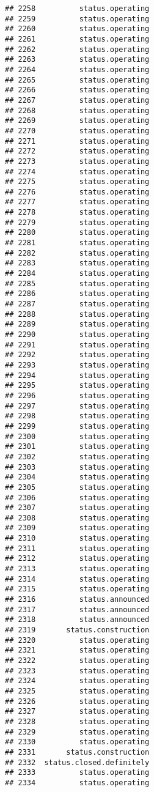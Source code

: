 \documentclass[
]{article}
\begin{document}
\begin{verbatim}
## 2258          status.operating
## 2259          status.operating
## 2260          status.operating
## 2261          status.operating
## 2262          status.operating
## 2263          status.operating
## 2264          status.operating
## 2265          status.operating
## 2266          status.operating
## 2267          status.operating
## 2268          status.operating
## 2269          status.operating
## 2270          status.operating
## 2271          status.operating
## 2272          status.operating
## 2273          status.operating
## 2274          status.operating
## 2275          status.operating
## 2276          status.operating
## 2277          status.operating
## 2278          status.operating
## 2279          status.operating
## 2280          status.operating
## 2281          status.operating
## 2282          status.operating
## 2283          status.operating
## 2284          status.operating
## 2285          status.operating
## 2286          status.operating
## 2287          status.operating
## 2288          status.operating
## 2289          status.operating
## 2290          status.operating
## 2291          status.operating
## 2292          status.operating
## 2293          status.operating
## 2294          status.operating
## 2295          status.operating
## 2296          status.operating
## 2297          status.operating
## 2298          status.operating
## 2299          status.operating
## 2300          status.operating
## 2301          status.operating
## 2302          status.operating
## 2303          status.operating
## 2304          status.operating
## 2305          status.operating
## 2306          status.operating
## 2307          status.operating
## 2308          status.operating
## 2309          status.operating
## 2310          status.operating
## 2311          status.operating
## 2312          status.operating
## 2313          status.operating
## 2314          status.operating
## 2315          status.operating
## 2316          status.announced
## 2317          status.announced
## 2318          status.announced
## 2319       status.construction
## 2320          status.operating
## 2321          status.operating
## 2322          status.operating
## 2323          status.operating
## 2324          status.operating
## 2325          status.operating
## 2326          status.operating
## 2327          status.operating
## 2328          status.operating
## 2329          status.operating
## 2330          status.operating
## 2331       status.construction
## 2332  status.closed.definitely
## 2333          status.operating
## 2334          status.operating

\end{verbatim}
\end{document}
